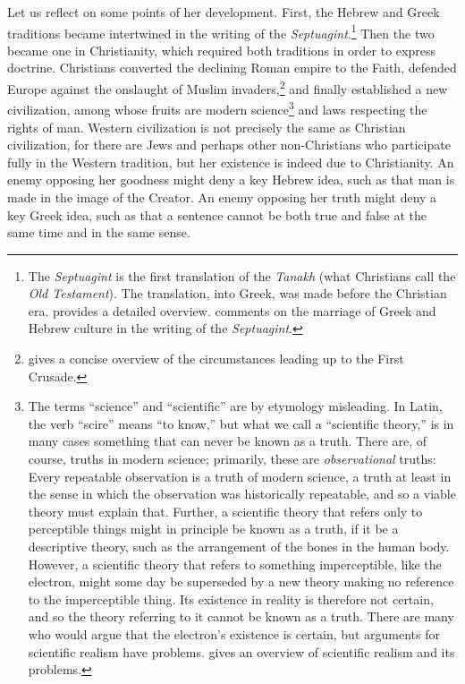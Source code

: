 \documentclass[twocolumn]{article}
\begin{document}
Let us reflect on some points of her development.  First, the Hebrew and Greek
traditions became intertwined in the writing of the {\it
Septuagint}.\footnote{%
   The {\it Septuagint} is the first translation of the {\it Tanakh} (what
   Christians call the {\it Old Testament}).  The translation, into Greek, was
   made before the Christian era.  \cite{vdh1912} provides a detailed overview.
   \cite{r2005, r2007} comments on the marriage of Greek and Hebrew culture in
   the writing of the {\it Septuagint}.
}
Then the two became one in Christianity, which required both traditions in
order to express doctrine.  Christians converted the declining Roman empire to
the Faith, defended Europe against the onslaught of Muslim invaders,\footnote{%
   \citet[Chapter 4]{b1938} gives a concise overview of the circumstances
   leading up to the First Crusade.
}
and finally established a new civilization, among whose fruits are modern
science\footnote{%
   The terms ``science'' and ``scientific'' are by etymology misleading.  In
   Latin, the verb ``scire'' means ``to know,'' but what we call a ``scientific
   theory,'' is in many cases something that can never be known as a truth.
   There are, of course, truths in modern science; primarily, these are
   \emph{observational} truths: Every repeatable observation is a truth of
   modern science, a truth at least in the sense in which the observation was
   historically repeatable, and so a viable theory must explain that.  Further,
   a scientific theory that refers only to perceptible things might in
   principle be known as a truth, if it be a descriptive theory, such as the
   arrangement of the bones in the human body.  However, a scientific theory
   that refers to something imperceptible, like the electron, might some day be
   superseded by a new theory making no reference to the imperceptible thing.
   Its existence in reality is therefore not certain, and so the theory
   referring to it cannot be known as a truth.  There are many who would argue
   that the electron's existence is certain, but arguments for scientific
   realism have problems. \cite{c2016} gives an overview of scientific realism
   and its problems.%
}
and laws respecting the rights of man.  Western civilization is not precisely
the same as Christian civilization, for there are Jews and perhaps other
non-Christians who participate fully in the Western tradition, but her
existence is indeed due to Christianity.  An enemy opposing her goodness might
deny a key Hebrew idea, such as that man is made in the image of the Creator.
An enemy opposing her truth might deny a key Greek idea, such as that a
sentence cannot be both true and false at the same time and in the same sense.
\end{document}
